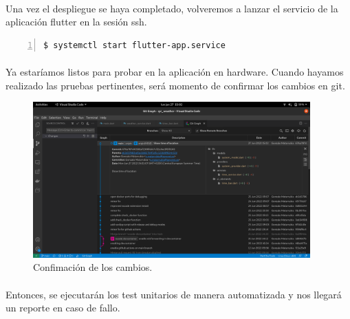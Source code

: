 \paragraph{}Una vez el despliegue se haya completado, volveremos a lanzar el servicio
de la aplicación flutter en la sesión ssh.

\begin{lstlisting}[style=consola, numbers=left]
    $ systemctl start flutter-app.service
\end{lstlisting}

\paragraph{}Ya estaríamos listos para probar en la aplicación en hardware. Cuando hayamos
realizado las pruebas pertinentes, será momento de confirmar los cambios en \gls{git}.

\begin{figure}[H]
    \centering
    \includegraphics[width=0.95\textwidth]{imgs/dev2}
    \caption[Confimación de los cambios.]{Confimación de los cambios.}
    \label{imgs:commit}
\end{figure}

\paragraph{}Entonces, se ejecutarán los test unitarios de manera automatizada y nos
llegará un reporte en caso de fallo.

